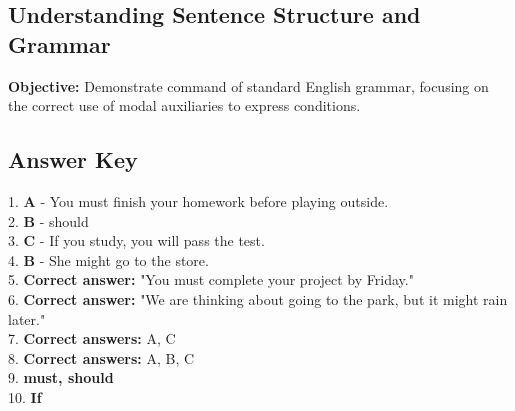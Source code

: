 \documentclass[12pt]{article}
\begin{document}
\subsection*{Understanding Sentence Structure and Grammar}
\onehalfspacing

\begin{tcolorbox}[colframe=black!40, colback=gray!0, title=Learning Objective]
\textbf{Objective:} Demonstrate command of standard English grammar, focusing on the correct use of modal auxiliaries to express conditions.
\end{tcolorbox}


\subsection*{Answer Key}

1. \textbf{A} - You must finish your homework before playing outside.\\
2. \textbf{B} - should\\
3. \textbf{C} - If you study, you will pass the test.\\
4. \textbf{B} - She might go to the store.\\
5. \textbf{Correct answer:} "You must complete your project by Friday."\\
6. \textbf{Correct answer:} "We are thinking about going to the park, but it might rain later."\\
7. \textbf{Correct answers:} A, C\\
8. \textbf{Correct answers:} A, B, C\\
9. \textbf{must, should} \\
10. \textbf{If} \\
\end{document}
